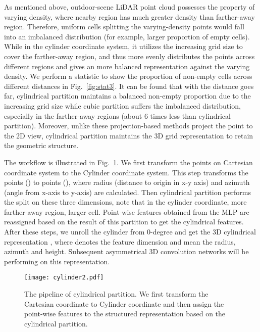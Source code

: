 \documentclass[final]{cvpr}
\begin{document}
As mentioned above, outdoor-scene LiDAR point cloud possesses the property of varying density, where nearby region has much greater density than farther-away region. Therefore, uniform cells splitting the varying-density points would fall into an imbalanced distribution (for example, larger proportion of empty cells). While in the cylinder coordinate system, it utilizes the increasing grid size to cover the farther-away region, and thus more evenly distributes the points across different regions and gives an more balanced representation against the varying density. We perform a statistic to show the proportion of non-empty cells across different distances in Fig.~\ref{fig:stat3}. It can be found that with the distance goes far, cylindrical partition maintains a balanced non-empty proportion due to the increasing grid size while cubic partition suffers the imbalanced distribution, especially in the farther-away regions (about 6 times less than cylindrical partition). Moreover, unlike these projection-based methods project the point to the 2D view, cylindrical partition maintains the 3D grid representation to retain the geometric structure. 

The workflow is illustrated in Fig.~\ref{fig:cylinder}. We first transform the points on Cartesian coordinate system to the Cylinder coordinate system. This step transforms the points () to points (), where radius  (distance to origin in x-y axis) and azimuth  (angle from x-axis to y-axis) are calculated. Then cylindrical partition performs the split on these three dimensions, note that in the cylinder coordinate, more farther-away region, larger cell. 
Point-wise features obtained from the MLP are reassigned based on the result of this partition to get the cylindrical features.
After these steps, we unroll the cylinder from 0-degree and get the 3D cylindrical representation , where  denotes the feature dimension and  mean the radius, azimuth and height.
Subsequent asymmetrical 3D convolution networks will be performing on this representation.


    \begin{figure}[t]
    \centering
    \texttt{[image: cylinder2.pdf]}
    \caption{The pipeline of cylindrical partition. We first transform the Cartesian coordinate to Cylinder coordinate and then assign the point-wise features to the structured representation based on the cylindrical partition.}
    \label{fig:cylinder}
    \end{figure}
\end{document}
